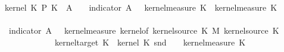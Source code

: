 \begin{isabellebody}
\ \ \ \ \ {\isachardoublequoteopen}kernel\ {\isacharparenleft}{\kern0pt}K{\isacharunderscore}{\kern0pt}{}\ {\isasymOtimes}\isactrlsub P\ K{\isacharunderscore}{\kern0pt}{}{\isacharparenright}{\kern0pt}\ {\isasymomega}\ A\ {\isacharequal}{\kern0pt}\ {\isacharparenleft}{\kern0pt}{\isasymintegral}\isactrlsup {\isacharplus}{\kern0pt}{\isasymomega}\ {\isacharparenleft}{\kern0pt}{\isasymintegral}\isactrlsup {\isacharplus}{\kern0pt}{\isasymomega}\ indicator\ A\ {\isacharparenleft}{\kern0pt}{\isasymomega}\ {\isasymomega}\ {\isasympartial}kernel{\isacharunderscore}{\kern0pt}measure\ K{\isacharunderscore}{\kern0pt}{}\ {\isasymomega}\ {\isasympartial}kernel{\isacharunderscore}{\kern0pt}measure\ K{\isacharunderscore}{\kern0pt}{}\ {\isasymomega}\isanewline
%
\isadelimproof
%
\endisadelimproof
%
\isatagproof
{}\isamarkupfalse%
\ {\isacharminus}{\kern0pt}\isanewline
\ \ \isamarkupfalse%
\ {}{\isacharcolon}{\kern0pt}\ {\isachardoublequoteopen}{\isacharparenleft}{\kern0pt}{\isasymintegral}\isactrlsup {\isacharplus}{\kern0pt}\ {\isasymomega}\ {\isasymintegral}\isactrlsup {\isacharplus}{\kern0pt}\ {\isasymomega}\ indicator\ A\ {\isacharparenleft}{\kern0pt}{\isasymomega}\ {\isasymomega}\ {\isasympartial}kernel{\isacharunderscore}{\kern0pt}measure\ {\isacharparenleft}{\kern0pt}kernel{\isacharunderscore}{\kern0pt}of\ {\isacharparenleft}{\kern0pt}kernel{\isacharunderscore}{\kern0pt}source\ K{\isacharunderscore}{\kern0pt}{}\ {\isasymOtimes}\isactrlsub M\ kernel{\isacharunderscore}{\kern0pt}source\ K{\isacharunderscore}{\kern0pt}{}{\isacharparenright}{\kern0pt}\isanewline
\ \ \ \ \ \ \ \ \ \ \ \ \ \ \ \ \ {\isacharparenleft}{\kern0pt}kernel{\isacharunderscore}{\kern0pt}target\ K{\isacharunderscore}{\kern0pt}{}{\isacharparenright}{\kern0pt}\ {\isacharparenleft}{\kern0pt}{\isasymlambda}{\isasymomega}{\isachardot}{\kern0pt}\ kernel\ K{\isacharunderscore}{\kern0pt}{}\ {\isacharparenleft}{\kern0pt}snd\ {\isasymomega}{\isacharparenright}{\kern0pt}{\isacharparenright}{\kern0pt}{\isacharparenright}{\kern0pt}\ {\isacharparenleft}{\kern0pt}{\isasymomega}\ {\isasymomega}\ {\isasympartial}kernel{\isacharunderscore}{\kern0pt}measure\ K{\isacharunderscore}{\kern0pt}{}\ {\isasymomega}\ {\isacharequal}{\kern0pt}\isanewline

\end{isabellebody}
